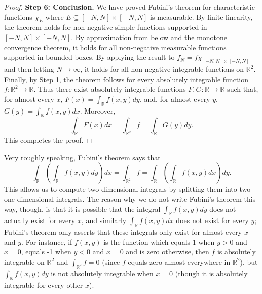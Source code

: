 \begin{proof}
\textbf{Step 6: Conclusion.}
We have proved Fubini's theorem for characteristic functions $\chi_{E}$ where $E\subseteq[-N,N]\times[-N,N]$ is measurable. By finite linearity, the theorem holds for non-negative simple functions supported in $[-N,N]\times[-N,N]$. By approximation from below and the monotone convergence theorem, it holds for all non-negative measurable functions supported in bounded boxes. By applying the result to $f_{N}=f\chi_{[-N,N]\times[-N,N]}$ and then letting $N\rightarrow\infty$, it holds for all non-negative integrable functions on $\mathbb{R}^{2}$. Finally, by Step 1, the theorem follows for every absolutely integrable function $f:\mathbb{R}^{2}\rightarrow\mathbb{R}$. Thus there exist absolutely integrable functions $F,G:\mathbb{R}\rightarrow\mathbb{R}$ such that, for almost every $x$, $F(x)=\int_{\mathbb{R}}f(x,y)dy$, and, for almost every $y$, $G(y)=\int_{\mathbb{R}}f(x,y)dx$. Moreover,
\[
    \int_{\mathbb{R}}F(x)dx=\int_{\mathbb{R}^{2}}f=\int_{\mathbb{R}}G(y)dy.
\]
This completes the proof.
\end{proof}

\begin{remark}
Very roughly speaking, Fubini's theorem says that
$$\int_{\mathbb{R}}\left(\int_{\mathbb{R}}f(x,y)dy\right)dx=\int_{\mathbb{R}^{2}}f=\int_{\mathbb{R}}\left(\int_{\mathbb{R}}f(x,y)dx\right)dy.$$
This allows us to compute two-dimensional integrals by splitting them into two one-dimensional integrals. The reason why we do not write Fubini's theorem this way, though, is that it is possible that the integral $\int_{\mathbb{R}}f(x,y)dy$ does not actually exist for every $x$, and similarly $\int_{\mathbb{R}}f(x,y)dx$ does not exist for every $y$; Fubini's theorem only asserts that these integrals only exist for almost every $x$ and $y$. For instance, if $f(x,y)$ is the function which equals 1 when $y>0$ and $x=0$, equals -1 when $y<0$ and $x=0$ and is zero otherwise, then $f$ is absolutely integrable on $\mathbb{R}^{2}$ and $\int_{\mathbb{R}^{2}}f=0$ (since $f$ equals zero almost everywhere in $\mathbb{R}^{2}$), but $\int_{\mathbb{R}}f(x,y)dy$ is not absolutely integrable when $x=0$ (though it is absolutely integrable for every other $x$).
\end{remark}

